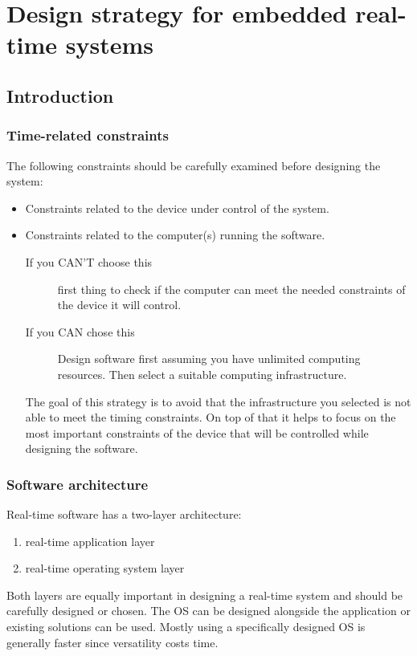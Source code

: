 \documentclass[../main.tex]{subfiles}
\begin{document}
\chapter{Design strategy for embedded real-time systems}

\section{Introduction}

\subsection{Time-related constraints}
The following constraints should be carefully examined before designing the system: 
\begin{itemize}
	\item Constraints related to the device under control of the system. 
	\item Constraints related to the computer(s) running the software. 
		\begin{description}
			\item[If you CAN'T choose this] first thing to check if the computer can meet the needed constraints of the device it will control.
				\item[If you CAN  chose this] Design software first assuming you have unlimited computing resources. Then select a suitable computing infrastructure.
		\end{description} 
	The goal of this strategy is to avoid that the infrastructure you selected is not able to meet the timing constraints. On top of that it helps to focus on the most important constraints of the device that will be controlled while designing the software.
\end{itemize}




\subsection{Software architecture}
Real-time software has a two-layer architecture: 
\begin{enumerate}
	\item real-time application layer
	\item real-time operating system layer
\end{enumerate}

Both layers are equally important in designing a real-time system and should be carefully designed or chosen.
The OS can be designed alongside the application or existing solutions can be used. 
Mostly using a specifically designed OS is generally faster since versatility costs time.
\end{document}
